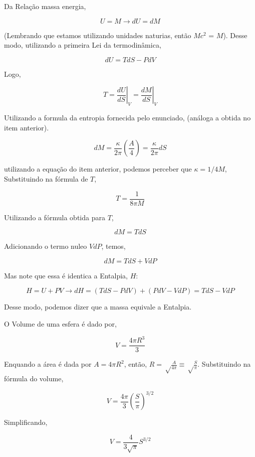 \documentclass[11pt]{article}
\begin{document}
\begin{pproblem}
\begin{pssolution*}{}{}
\begin{alternativas}
            \item Da Relação massa energia, 
            
            \[U = M \rightarrow dU = dM\]

            (Lembrando que estamos utilizando unidades naturias, então \(Mc^2\) = \(M\)). Desse modo, utilizando a primeira Lei da termodinâmica, 

            \[dU = TdS - PdV\]

            Logo, 

            \[T = \left.\frac{dU}{dS}\right\vert_V = \left.\frac{dM}{dS}\right\vert_V\]

            Utilizando a formula da entropia fornecida pelo enunciado, (análoga a obtida no item anterior). 

            \[dM = \frac{\kappa}{2\pi}\left(\frac{A}{4}\right) = \frac{\kappa}{2\pi}dS\]

            utilizando a equação do item anterior, podemos perceber que \(\kappa = 1/4M\), Substituindo na fórmula de \(T\),

            \[\boxed{T = \frac{1}{8\pi M}}\]

            \item Utilizando a fórmula obtida para \(T\), 
            
            \[dM = TdS\]

            Adicionando o termo nuleo \(VdP\), temos, 

            \[dM = TdS + VdP\]

            Mas note que essa é identica a Entalpia, \(H\):

            \[H = U + PV \rightarrow dH = (TdS - PdV) +  (PdV - VdP) = TdS - VdP\]

            Desse modo, podemos dizer que a massa equivale a Entalpia.

            \item O Volume de uma esfera é dado por, 
            
            \[V = \frac{4\pi R^3}{3}\]

            Enquando a área é dada por \(A = 4\pi R^2\), então, \(R = \sqrt\frac{A}{4\pi}\equiv \sqrt\frac{S}{\pi}\). Substituindo na fórmula do volume,
            
            \[V = \frac{4\pi}{3}\left(\frac{S}{\pi}\right)^{3/2}\]

            Simplificando, 

            \[\boxed{V = \frac{4}{3\sqrt{\pi}}S^{3/2}}\]


\end{alternativas}
\end{pssolution*}
\end{pproblem}
\end{document}

